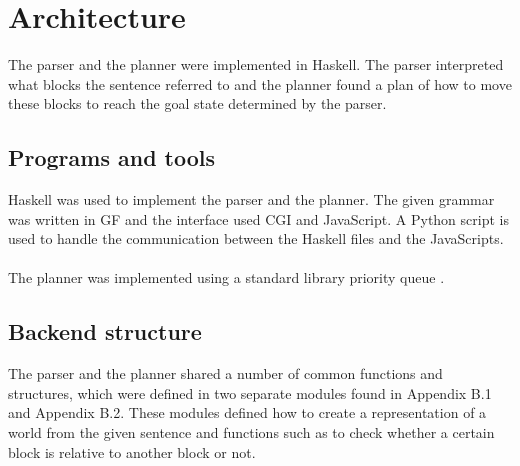 \chapter{Architecture}
The parser and the planner were implemented in Haskell. The parser interpreted
what blocks the sentence referred to and the planner found a plan of how to
move these blocks to reach the goal state determined by the parser. 

\section{Programs and tools}
Haskell was used to implement the parser and the planner. The given grammar was
written in GF and the interface used CGI and JavaScript. A Python script is
used to handle the communication between the Haskell files and the JavaScripts.
\\\\
The planner was implemented using a standard library priority queue \citep{psq_url}. 

\section{Backend structure}
The parser and the planner shared a number of common functions and structures,
which were defined in two separate modules found in Appendix B.1 and Appendix
B.2. These modules defined how to create a representation of a world from the
given sentence and functions such as to check whether a certain block is
relative to another block or not. 

